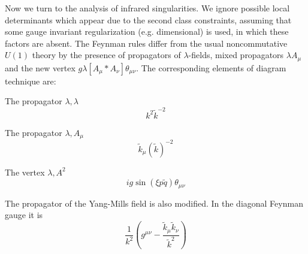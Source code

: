 \documentclass[a4paper,12pt]{article}
\begin{document}
Now we turn to the analysis of infrared singularities. We ignore 
 possible local determinants which appear due to the second class 
 constraints, assuming that some gauge invariant regularization (e.g. 
 dimensional) is used, in which these factors are absent. The Feynman 
 rules differ from the usual noncommutative 
 $U(1)$ theory by the presence of propagators of $\lambda$-fields, mixed 
 propagators $ \lambda A_{\mu}$ and the new vertex $g 
 \lambda[A_{\mu}*A_{\nu}] \theta_{\mu \nu}$. The corresponding elements 
 of diagram technique are:

The propagator $\lambda, \lambda$
 \begin{equation} 
k^2 \tilde{k}^{-2}
\label{l5} 
\end{equation} 

The propagator $\lambda, A_{\mu}$
\begin{equation} 
\tilde{k}_{\mu}(\tilde{k})^{-2}
\label{16} 
\end{equation} 

The vertex $\lambda, A^2$
\begin{equation} 
ig \sin(\xi p \tilde{q}) \theta_{\mu \nu}
 \label{18} 
\end{equation} 

The propagator of the Yang-Mills field is also modified. In the diagonal 
Feynman gauge it is
 \begin{equation}
\frac{1}{k^2}(g^{\mu \nu}- \frac{\tilde{k}_{\mu} 
\tilde{k}_{\nu}}{\tilde{k}^2})
 \label{19}
 \end{equation}
\end{document}
